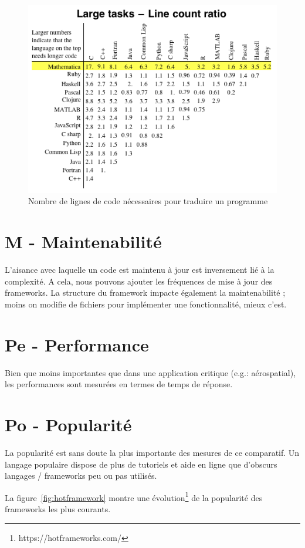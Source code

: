 \documentclass[a4paper, 11pt]{article}
\begin{document}
\begin{figure}
    \centering
    \includegraphics[width=.8\textwidth]{Etude_Technologique_1/sloc_comparison.png}
    \caption{Nombre de lignes de code nécessaires pour traduire un programme}
    \label{fig:sloc_comparison}
\end{figure}

\section*{M - Maintenabilité}
L'aisance avec laquelle un code est maintenu à jour est inversement lié à la complexité. A cela, nous pouvons ajouter les fréquences de mise à jour des frameworks. La structure du framework impacte également la maintenabilité ; moins on modifie de fichiers pour implémenter une fonctionnalité, mieux c'est.

\section*{Pe - Performance}
Bien que moins importantes que dans une application critique (e.g.: aérospatial), les performances sont mesurées en termes de temps de réponse.

\section*{Po - Popularité}
La popularité est sans doute la plus importante des mesures de ce comparatif. Un langage populaire dispose de plus de tutoriels et aide en ligne que d'obscurs langages / frameworks peu ou pas utilisés.

La figure~\ref{fig:hotframework} montre une évolution\footnote{https://hotframeworks.com/} de la popularité des frameworks les plus courants.
\end{document}
